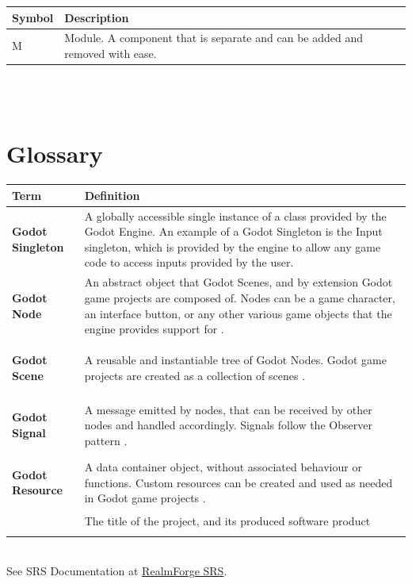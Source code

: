 \documentclass[12pt, titlepage]{article}
\newcommand{\glossaryDef}[3]{\hypertarget{#1}{\textbf{#2}} & {#3}\\}
\begin{document}
\noindent \newline
\renewcommand{\arraystretch}{1.2}
\begin{tabularx}{\textwidth}{l p{13cm}} 
	\toprule		
	\textbf{Symbol} & \textbf{Description}\\
	\midrule 
	M & Module. A component that is separate and can be added and removed with ease. \\
	\bottomrule
\end{tabularx}\\
\\


\section{Glossary}
\label{sec:Glossary}

\renewcommand{\arraystretch}{1.2}
\begin{tabularx}{\textwidth}{l p{13cm }} 
	\toprule		
	\textbf{Term} & \textbf{Definition}\\
	\midrule
	\glossaryDef{singleton}{Godot Singleton}{A globally accessible single 
	instance of a class provided by the Godot Engine. An example of a Godot 
	Singleton is the Input singleton, which is provided by the engine to allow 
	any game code to access inputs provided by the user.}
	\glossaryDef{node}{Godot Node}{An abstract object that Godot Scenes, and 
	by extension Godot game projects are composed of. Nodes can be a game 
	character, an interface button, or any other various game objects that the 
	engine provides support for \cite{GodotDocs}.}
	\glossaryDef{scene}{Godot Scene}{A reusable and instantiable tree of Godot 
	Nodes. Godot game projects are created as a collection of scenes 
	\cite{GodotDocs}.}
	\glossaryDef{signal}{Godot Signal}{A message emitted by nodes, that can be 
	received by other nodes and handled accordingly. Signals follow the 
	Observer pattern \cite{GodotDocs}.}
	\glossaryDef{resource}{Godot Resource}{A data container object, without 
	associated behaviour or functions. Custom resources can be created and used 
	as needed in Godot game projects \cite{GodotDocs}.}
	\glossaryDef{\progname}{\progname} {The title of the project, and its produced software product}\\
	\bottomrule
\end{tabularx}\\
\noindent See SRS Documentation at 
\href{https://github.com/Aeolus-Software/RealmForge/blob/main/pdfs/SRS/SRS.pdf}{RealmForge
	SRS}.
\end{document}
